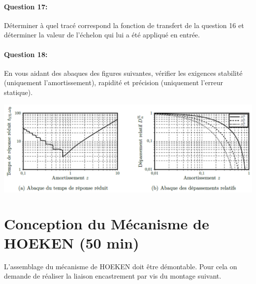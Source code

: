 \paragraph{Question 17:} Déterminer à quel tracé correspond la fonction de transfert de la question 16 et déterminer la valeur de l'échelon qui lui a été appliqué en entrée.


\paragraph{Question 18:} En vous aidant des abaques des figures suivantes, vérifier les exigences \og stabilité \fg (uniquement l'amortissement), \og rapidité \fg et \og précision \fg (uniquement l'erreur statique).

\begin{center}
 \includegraphics[width=0.8\linewidth]{img/Figure22}
\end{center}

\section{Conception du Mécanisme de HOEKEN (50 min)}

L'assemblage du mécanisme de HOEKEN doit être démontable. Pour cela on demande de réaliser la liaison encastrement par vis du montage suivant.

